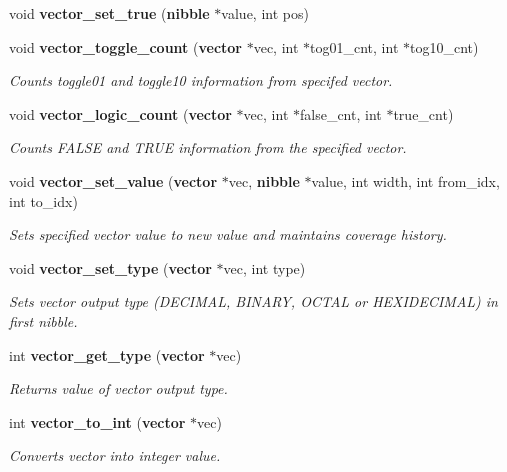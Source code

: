 \begin{CompactItemize}
\item 
void {\bf vector\_\-set\_\-true} ({\bf nibble} $\ast$value, int pos)
\item 
void {\bf vector\_\-toggle\_\-count} ({\bf vector} $\ast$vec, int $\ast$tog01\_\-cnt, int $\ast$tog10\_\-cnt)
\begin{CompactList}\small\item\em Counts toggle01 and toggle10 information from specifed vector.\item\end{CompactList}\item 
void {\bf vector\_\-logic\_\-count} ({\bf vector} $\ast$vec, int $\ast$false\_\-cnt, int $\ast$true\_\-cnt)
\begin{CompactList}\small\item\em Counts FALSE and TRUE information from the specified vector.\item\end{CompactList}\item 
void {\bf vector\_\-set\_\-value} ({\bf vector} $\ast$vec, {\bf nibble} $\ast$value, int width, int from\_\-idx, int to\_\-idx)
\begin{CompactList}\small\item\em Sets specified vector value to new value and maintains coverage history.\item\end{CompactList}\item 
void {\bf vector\_\-set\_\-type} ({\bf vector} $\ast$vec, int type)
\begin{CompactList}\small\item\em Sets vector output type (DECIMAL, BINARY, OCTAL or HEXIDECIMAL) in first nibble.\item\end{CompactList}\item 
int {\bf vector\_\-get\_\-type} ({\bf vector} $\ast$vec)
\begin{CompactList}\small\item\em Returns value of vector output type.\item\end{CompactList}\item 
int {\bf vector\_\-to\_\-int} ({\bf vector} $\ast$vec)
\begin{CompactList}\small\item\em Converts vector into integer value.\item\end{CompactList}\item 

\end{CompactItemize}
